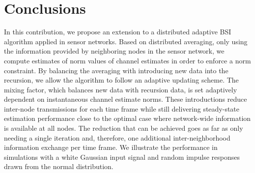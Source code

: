 \documentclass{article}
\begin{document}
\section[]{Conclusions}
\label{sec:conclusions}
In this contribution, we propose an extension to a distributed adaptive BSI algorithm applied in sensor networks.
Based on distributed averaging, only using the information provided by neighboring nodes in the sensor network, we compute estimates of norm values of channel estimates in order to enforce a norm constraint.
By balancing the averaging with introducing new data into the recursion, we allow the algorithm to follow an adaptive updating scheme.
The mixing factor, which balances new data with recursion data, is set adaptively dependent on instantaneous channel estimate norms.
These introductions reduce inter-node transmissions for each time frame while still delivering steady-state estimation performance close to the optimal case where network-wide information is available at all nodes.
The reduction that can be achieved goes as far as only needing a single iteration and, therefore, one additional inter-neighborhood information exchange per time frame.
We illustrate the performance in simulations with a white Gaussian input signal and random impulse responses drawn from the normal distribution.

\vfill\pagebreak



\end{document}

